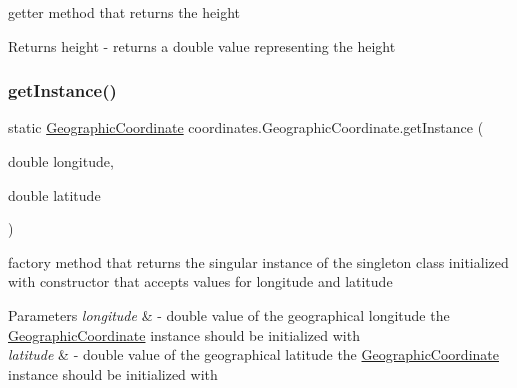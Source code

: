 getter method that returns the height 

\begin{DoxyReturn}{Returns}
height -\/ returns a double value representing the height 
\end{DoxyReturn}
\mbox{\label{classcoordinates_1_1_geographic_coordinate_a29ced8017420b012f7bd5749ed6ba600}} 
\subsubsection{\texorpdfstring{get\+Instance()}{getInstance()}\hspace{0.1cm}{\footnotesize\ttfamily [1/2]}}
{\footnotesize\ttfamily static \hyperlink{classcoordinates_1_1_geographic_coordinate}{Geographic\+Coordinate} coordinates.\+Geographic\+Coordinate.\+get\+Instance (\begin{DoxyParamCaption}\item[{double}]{longitude,  }\item[{double}]{latitude }\end{DoxyParamCaption})\hspace{0.3cm}{\ttfamily [static]}}



factory method that returns the singular instance of the singleton class initialized with constructor that accepts values for longitude and latitude 


\begin{DoxyParams}{Parameters}
{\em longitude} & -\/ double value of the geographical longitude the \hyperlink{classcoordinates_1_1_geographic_coordinate}{Geographic\+Coordinate} instance should be initialized with \\
\hline
{\em latitude} & -\/ double value of the geographical latitude the \hyperlink{classcoordinates_1_1_geographic_coordinate}{Geographic\+Coordinate} instance should be initialized with \\
\hline
\end{DoxyParams}
\mbox{\label{classcoordinates_1_1_geographic_coordinate_afa986233325df2fb8a8b47d4ddeaee46}} 
